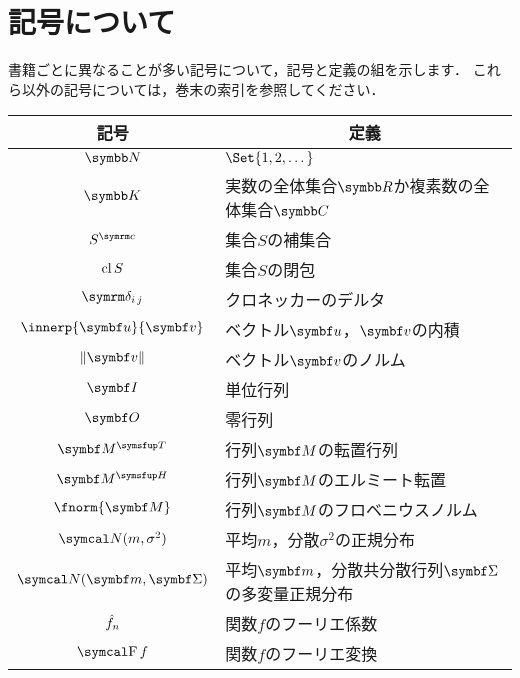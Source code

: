 \documentclass[../../main]{subfiles}
\begin{document}
\chapter{記号について}
\thispagestyle{empty}
書籍ごとに異なることが多い記号について，記号と定義の組を示します．
これら以外の記号については，巻末の索引を参照してください．

\vspace*{\fill}
\begin{table*}
  \centering
  \begin{tabular}{c|l} \hline
    記号 & \multicolumn{1}{c}{定義} \\ \hline
    \(\numset{N}\) & \(\Set{1,2,\dotsc}\) \\
    \(\numset{K}\) & 実数の全体集合\(\numset{R}\)か複素数の全体集合\(\numset{C}\) \\
    \(\scomp{S}\) & 集合\(S\)の補集合 \\
    \(\operatorname{cl} S\) & 集合\(S\)の閉包 \\
    \(\ddelta{i}{j}\) & クロネッカーのデルタ \\
    \(\innerp{\vect{u}}{\vect{v}}\) & ベクトル\(\vect{u}\)，\(\vect{v}\)の内積 \\
    \(\vnorm{\vect{v}}\) & ベクトル\(\vect{v}\)のノルム \\
    \(\imat\) & 単位行列 \\
    \(\zmat\) & 零行列 \\
    \(\trps{\mat{M}}\) & 行列\(\mat{M}\)の転置行列 \\
    \(\htrps{\mat{M}}\) & 行列\(\mat{M}\)のエルミート転置 \\
    \(\fnorm{\mat{M}}\) & 行列\(\mat{M}\)のフロベニウスノルム \\
    \(\ndist(m,\sigma^2)\) & 平均\(m\)，分散\(\sigma^2\)の正規分布 \\
    \(\ndist(\vect{m},\mat{\Sigma})\) & 平均\(\vect{m}\)，分散共分散行列\(\mat{\Sigma}\)の多変量正規分布 \\
    \(\hat{f}_n\) & 関数\(f\)のフーリエ係数 \\
    \(\ftrans f\) & 関数\(f\)のフーリエ変換 \\ \hline
  \end{tabular}
\end{table*}
\vspace*{\fill}
\end{document}
